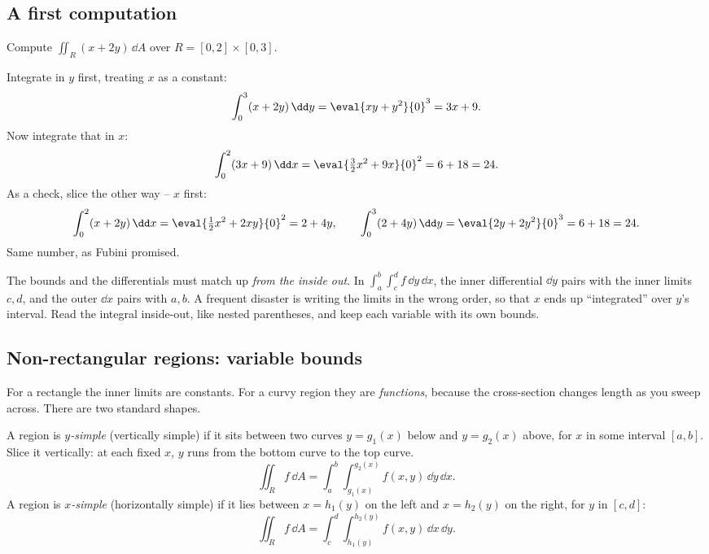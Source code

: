 \subsection{A first computation}

\begin{example}
\label{ch34:ex-rect}
Compute $\displaystyle\iint_R (x+2y)\,\dd A$ over $R=[0,2]\times[0,3]$.

Integrate in $y$ first, treating $x$ as a constant:
\[
  \int_0^3 (x+2y)\,\dd y
  =\eval{xy+y^2}{0}^{3}
  =3x+9 .
\]
Now integrate that in $x$:
\[
  \int_0^2 (3x+9)\,\dd x
  =\eval{\tfrac{3}{2}x^2+9x}{0}^{2}
  =6+18=24 .
\]
As a check, slice the other way -- $x$ first:
\[
  \int_0^2 (x+2y)\,\dd x=\eval{\tfrac12 x^2+2xy}{0}^{2}=2+4y,
  \qquad
  \int_0^3 (2+4y)\,\dd y=\eval{2y+2y^2}{0}^{3}=6+18=24 .
\]
Same number, as Fubini promised.
\end{example}

\begin{trapbox}
The bounds and the differentials must match up \emph{from the inside out}. In
$\int_a^b\!\int_c^d f\,\dd y\,\dd x$, the inner differential $\dd y$ pairs with
the inner limits $c,d$, and the outer $\dd x$ pairs with $a,b$. A frequent
disaster is writing the limits in the wrong order, so that $x$ ends up
``integrated'' over $y$'s interval. Read the integral inside-out, like nested
parentheses, and keep each variable with its own bounds.
\end{trapbox}

\subsection{Non-rectangular regions: variable bounds}

For a rectangle the inner limits are constants. For a curvy region they are
\emph{functions}, because the cross-section changes length as you sweep across.
There are two standard shapes.

A region is \emph{$y$-simple} (vertically simple) if it sits between two curves
$y=g_1(x)$ below and $y=g_2(x)$ above, for $x$ in some interval $[a,b]$. Slice it
vertically: at each fixed $x$, $y$ runs from the bottom curve to the top curve.
\[
  \iint_R f\,\dd A=\int_a^b\!\int_{g_1(x)}^{g_2(x)} f(x,y)\,\dd y\,\dd x .
\]
A region is \emph{$x$-simple} (horizontally simple) if it lies between
$x=h_1(y)$ on the left and $x=h_2(y)$ on the right, for $y$ in $[c,d]$:
\[
  \iint_R f\,\dd A=\int_c^d\!\int_{h_1(y)}^{h_2(y)} f(x,y)\,\dd x\,\dd y .
\]

